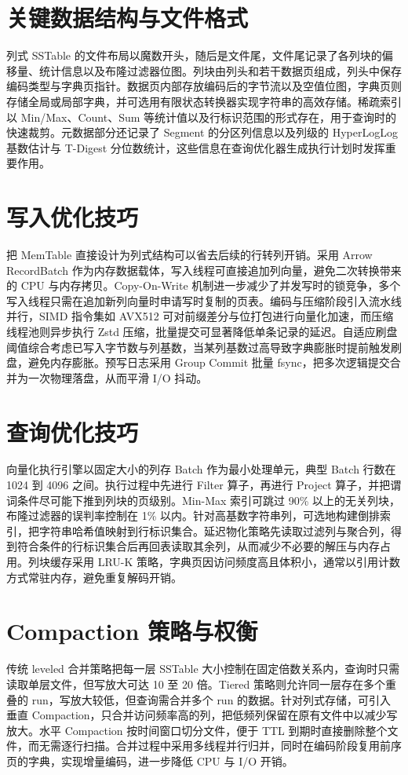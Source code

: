 \chapter{关键数据结构与文件格式}
列式 SSTable 的文件布局以魔数开头，随后是文件尾，文件尾记录了各列块的偏移量、统计信息以及布隆过滤器位图。列块由列头和若干数据页组成，列头中保存编码类型与字典页指针。数据页内部存放编码后的字节流以及空值位图，字典页则存储全局或局部字典，并可选用有限状态转换器实现字符串的高效存储。稀疏索引以 Min/Max、Count、Sum 等统计值以及行标识范围的形式存在，用于查询时的快速裁剪。元数据部分还记录了 Segment 的分区列信息以及列级的 HyperLogLog 基数估计与 T-Digest 分位数统计，这些信息在查询优化器生成执行计划时发挥重要作用。\par
\chapter{写入优化技巧}
把 MemTable 直接设计为列式结构可以省去后续的行转列开销。采用 Arrow RecordBatch 作为内存数据载体，写入线程可直接追加列向量，避免二次转换带来的 CPU 与内存拷贝。Copy-On-Write 机制进一步减少了并发写时的锁竞争，多个写入线程只需在追加新列向量时申请写时复制的页表。编码与压缩阶段引入流水线并行，SIMD 指令集如 AVX512 可对前缀差分与位打包进行向量化加速，而压缩线程池则异步执行 Zstd 压缩，批量提交可显著降低单条记录的延迟。自适应刷盘阈值综合考虑已写入字节数与列基数，当某列基数过高导致字典膨胀时提前触发刷盘，避免内存膨胀。预写日志采用 Group Commit 批量 fsync，把多次逻辑提交合并为一次物理落盘，从而平滑 I/O 抖动。\par
\chapter{查询优化技巧}
向量化执行引擎以固定大小的列存 Batch 作为最小处理单元，典型 Batch 行数在 1024 到 4096 之间。执行过程中先进行 Filter 算子，再进行 Project 算子，并把谓词条件尽可能下推到列块的页级别。Min-Max 索引可跳过 90\%{} 以上的无关列块，布隆过滤器的误判率控制在 1\%{} 以内。针对高基数字符串列，可选地构建倒排索引，把字符串哈希值映射到行标识集合。延迟物化策略先读取过滤列与聚合列，得到符合条件的行标识集合后再回表读取其余列，从而减少不必要的解压与内存占用。列块缓存采用 LRU-K 策略，字典页因访问频度高且体积小，通常以引用计数方式常驻内存，避免重复解码开销。\par
\chapter{Compaction 策略与权衡}
传统 leveled 合并策略把每一层 SSTable 大小控制在固定倍数关系内，查询时只需读取单层文件，但写放大可达 10 至 20 倍。Tiered 策略则允许同一层存在多个重叠的 run，写放大较低，但查询需合并多个 run 的数据。针对列式存储，可引入垂直 Compaction，只合并访问频率高的列，把低频列保留在原有文件中以减少写放大。水平 Compaction 按时间窗口切分文件，便于 TTL 到期时直接删除整个文件，而无需逐行扫描。合并过程中采用多线程并行归并，同时在编码阶段复用前序页的字典，实现增量编码，进一步降低 CPU 与 I/O 开销。\par
